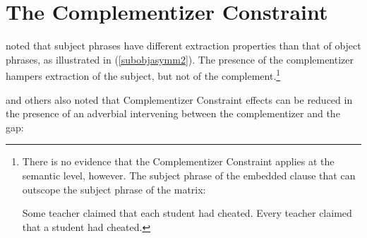 \documentclass[output=paper
                ,modfonts
                ,nonflat
	        ,collection
	        ,collectionchapter
	        ,collectiontoclongg
 	        ,biblatex
                ,babelshorthands
                ,newtxmath
                ,draftmode
                ,colorlinks, citecolor=brown
]{./langsci/langscibook}
\begin{document}
 
 
 
\section{The Complementizer Constraint}

\citet{Perlmutter68} noted that subject phrases have different extraction properties than that of object phrases, as illustrated in (\ref{subobjasymm2}). The presence of the complementizer hampers extraction of the subject, but not of the complement.\footnote{There is no evidence that the Complementizer Constraint applies at the semantic level, however. The  subject phrase of the embedded clause that can outscope the subject phrase of  the matrix:

\eal
\ex Some teacher claimed that each student had cheated.
\ex Every teacher claimed that a student had cheated.
\zllast
} 

\eal   \label{subobjasymm2}
\zl



\noindent
\citet{Bresnan:77} and others also noted that  Complementizer Constraint effects can be
reduced in the presence of an adverbial intervening between the complementizer and the gap:

\eal \label{advcirc}
\zl
\end{document}
